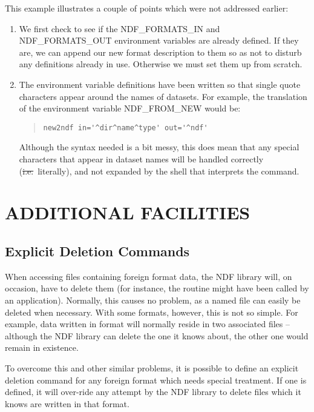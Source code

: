 This example illustrates a couple of points which were not addressed
earlier:

\begin{enumerate}
\item We first check to see if the NDF\_FORMATS\_IN and
NDF\_FORMATS\_OUT environment variables are already defined. If they
are, we can append our new format description to them so as not to
disturb any definitions already in use. Otherwise we must set them up
from scratch.

\item The environment variable definitions have been written so that
single quote characters appear around the names of datasets. For
example, the translation of the environment variable NDF\_FROM\_NEW
would be:
\begin{quote}
\begin{small}
\begin{verbatim}
new2ndf in='^dir^name^type' out='^ndf'
\end{verbatim}
\end{small}
\end{quote}
Although the syntax needed is a bit messy, this does mean that any
special characters that appear in dataset names will be handled
correctly (\st{i.e.}\ literally), and not expanded by the shell that
interprets the command.
\end{enumerate}

\section{ADDITIONAL FACILITIES}

\subsection{Explicit Deletion Commands}

When accessing files containing foreign format data, the NDF library
will, on occasion, have to delete them (for instance, the routine
 might have been called by an
application).  Normally, this causes no problem, as a named file can
easily be deleted when necessary.  With some formats, however, this is
not so simple. For example, data written in 
format will normally reside in two associated files -- although the
NDF library can delete the one it knows about, the other one would
remain in existence.

To overcome this and other similar problems, it is possible to define
an explicit deletion command for any foreign format which needs
special treatment. If one is defined, it will over-ride any attempt by
the NDF library to delete files which it knows are written in that
format.

